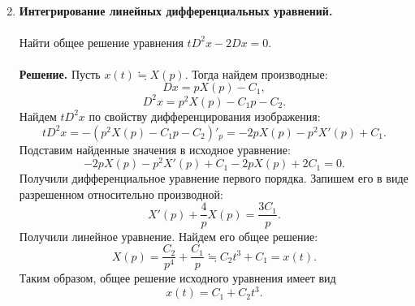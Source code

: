 \documentclass[a4paper, 12pt]{article}
\begin{document}
\begin{enumerate}
\begin{multline*}
		\end{multline*}
		\item \textbf{Интегрирование линейных дифференциальных уравнений.}\\\\
		Найти общее решение уравнения $tD^2x - 2Dx = 0$.\\\\
		\textbf{Решение.} Пусть $x(t) \fallingdotseq X(p)$. Тогда найдем производные:
		$$Dx = pX(p) - C_1,$$
		$$D^2x = p^2X(p) - C_1p - C_2.$$
		Найдем $tD^2x$ по свойству дифференцирования изображения:
		$$tD^2x = - (p^2X(p) - C_1p - C_2)'_p = -2pX(p) - p^2X'(p) + C_1.$$
		Подставим найденные значения в исходное уравнение:
		$$-2pX(p) - p^2X'(p) + C_1 - 2pX(p) + 2C_1 = 0.$$
		Получили дифференциальное уравнение первого порядка. Запишем его в виде разрешенном относительно производной:
		$$X'(p) + \dfrac{4}{p} X(p) = \dfrac{3C_1}{p}.$$
		Получили линейное уравнение. Найдем его общее решение:
		$$X(p) =\dfrac{C_2}{p^4} + \dfrac{C_1}{p} \fallingdotseq C_2t^3 + C_1 = x(t).$$
		Таким образом, общее решение исходного уравнения имеет вид $$x(t) = C_1 + C_2t^3.$$
	\end{enumerate}
\end{document}
